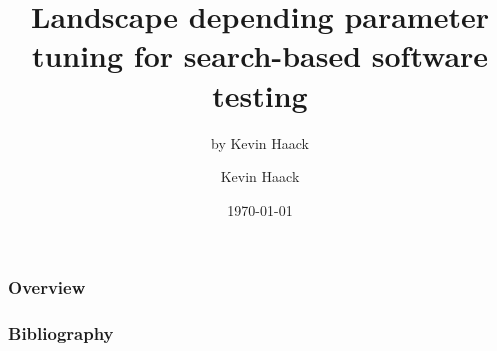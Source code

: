 \documentclass[aspectratio=169]{beamer}
\title{Landscape depending parameter
tuning for search-based software testing}
\subtitle{by Kevin Haack}
\author{Kevin Haack}
\institute{Software Engineering}
\date{\today}
\begin{document}
	
{
	\hnititlebackground 
	\begin{frame}
		\titlepage
	\end{frame}
}

{
	\begin{frame}
		\frametitle{Overview}
		\tableofcontents
	\end{frame}
}





{
	\begin{frame}[allowframebreaks]
		\frametitle{Bibliography}
		
		
	\end{frame}
}


{
	\hnifullbackground 
	
	\begin{frame}
		\textbf{\Huge{\centerline{}}}
	\end{frame}
}


{
 
}
\end{document}
